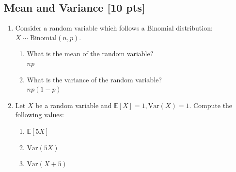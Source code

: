 \documentclass[a4paper]{article}
\theoremstyle{definition}
\newcommand{\Var}{\mathrm{Var}}
\newenvironment{soln}{
	\leavevmode\color{blue}\ignorespaces
}{}
\begin{document}
	\subsection{Mean and Variance [10 pts]}
	\begin{enumerate}
		\item Consider a random variable which follows a Binomial
		distribution: $X \sim \text{Binomial}(n, p)$.
		\begin{enumerate}
			\item What is the mean of the random variable?\\
			\begin{soln}  $ np $ \end{soln}
			\item What is the variance of the random variable?\\
			\begin{soln}  $ np(1-p) $ \end{soln}
		\end{enumerate}
		
		\item Let $X$ be a random variable and
		$\mathbb{E}[X] = 1, \Var(X) = 1$. Compute the following values:
		\begin{enumerate}
			\item $\mathbb{E}[5X]$\\
			\begin{soln}  5 \end{soln}
			\item $\Var(5X)$\\
			\begin{soln}  25 \end{soln}
			\item $\Var(X+5)$\\
			\begin{soln} 1 \end{soln}
		\end{enumerate}
	\end{enumerate}
	
	
\end{document}
